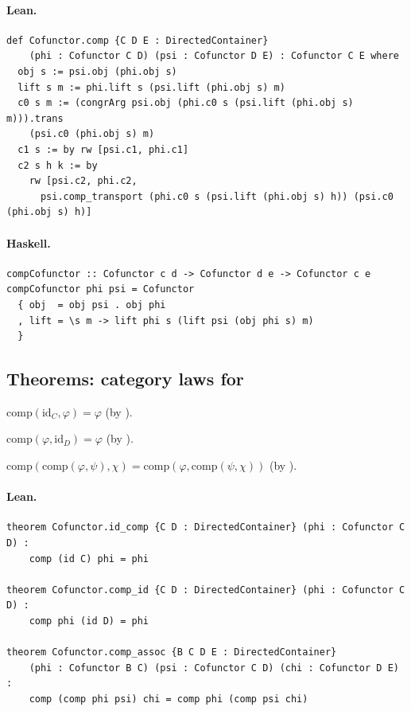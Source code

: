 \documentclass[11pt,a4paper]{article}
\begin{document}
\paragraph{Lean.}
\begin{lstlisting}[style=lean]
def Cofunctor.comp {C D E : DirectedContainer}
    (phi : Cofunctor C D) (psi : Cofunctor D E) : Cofunctor C E where
  obj s := psi.obj (phi.obj s)
  lift s m := phi.lift s (psi.lift (phi.obj s) m)
  c0 s m := (congrArg psi.obj (phi.c0 s (psi.lift (phi.obj s) m))).trans
    (psi.c0 (phi.obj s) m)
  c1 s := by rw [psi.c1, phi.c1]
  c2 s h k := by
    rw [psi.c2, phi.c2,
      psi.comp_transport (phi.c0 s (psi.lift (phi.obj s) h)) (psi.c0 (phi.obj s) h)]
\end{lstlisting}

\paragraph{Haskell.}
\begin{lstlisting}[style=haskell]
compCofunctor :: Cofunctor c d -> Cofunctor d e -> Cofunctor c e
compCofunctor phi psi = Cofunctor
  { obj  = obj psi . obj phi
  , lift = \s m -> lift phi s (lift psi (obj phi s) m)
  }
\end{lstlisting}


\subsection{Theorems: category laws for }

\begin{thm} $\mathrm{comp}(\mathrm{id}_C, \varphi) = \varphi$ (by ).
\end{thm}
\begin{thm} $\mathrm{comp}(\varphi, \mathrm{id}_D) = \varphi$ (by ).
\end{thm}
\begin{thm}[Associativity]
$\mathrm{comp}(\mathrm{comp}(\varphi, \psi), \chi) = \mathrm{comp}(\varphi, \mathrm{comp}(\psi, \chi))$
(by ).
\end{thm}

\paragraph{Lean.}
\begin{lstlisting}[style=lean]
theorem Cofunctor.id_comp {C D : DirectedContainer} (phi : Cofunctor C D) :
    comp (id C) phi = phi

theorem Cofunctor.comp_id {C D : DirectedContainer} (phi : Cofunctor C D) :
    comp phi (id D) = phi

theorem Cofunctor.comp_assoc {B C D E : DirectedContainer}
    (phi : Cofunctor B C) (psi : Cofunctor C D) (chi : Cofunctor D E) :
    comp (comp phi psi) chi = comp phi (comp psi chi)
\end{lstlisting}
\end{document}
